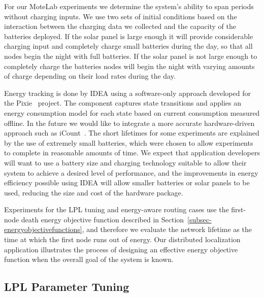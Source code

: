 For our MoteLab experiments we determine the system's ability to span periods
without charging inputs. We use two sets of initial conditions based on the
interaction between the charging data we collected and the capacity of the
batteries deployed. If the solar panel is large enough it will provide
considerable charging input and completely charge small batteries during the
day, so that all nodes begin the night with full batteries. If the solar
panel is not large enough to completely charge the batteries nodes will begin
the night with varying amounts of charge depending on their load rates during
the day.

Energy tracking is done by IDEA using a software-only approach developed for
the Pixie~\cite{pixie-sensys08} project. The component captures state
transitions and applies an energy consumption model for each state based on
current consumption measured offline. In the future we would like to
integrate a more accurate hardware-driven approach such as
iCount~\cite{icount-spots08}. The short lifetimes for some experiments are
explained by the use of extremely small batteries, which were chosen to allow
experiments to complete in reasonable amounts of time. We expect that
application developers will want to use a battery size and charging
technology suitable to allow their system to achieve a desired level of
performance, and the improvements in energy efficiency possible using IDEA
will allow smaller batteries or solar panels to be used, reducing the size
and cost of the hardware package.

Experiments for the LPL tuning and energy-aware routing cases use the
first-node death energy objective function described in
Section~\ref{subsec-energyobjectivefunctions}, and therefore we evaluate the
network lifetime as the time at which the first node runs out of energy. Our
distributed localization application illustrates the process of designing an
effective energy objective function when the overall goal of the system is
known.

\subsection{LPL Parameter Tuning}
\label{subsec-lplparametertuning}

